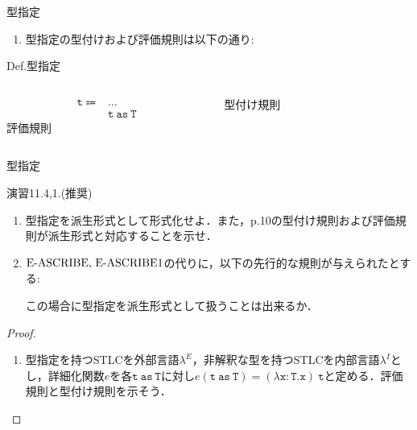 \documentclass[9pt]{beamer}
\begin{document}
\begin{frame}{型指定}
\begin{enumerate}
\item 型指定の型付けおよび評価規則は以下の通り:
\end{enumerate}
\begin{alertblock}{Def.型指定}
    \begin{columns}
    \begin{column}{0.30\columnwidth}
        \begin{align*}
        \mathtt{t}\Coloneq&\ldots\\
        &\mathtt{t\ as\ T}
        \end{align*}
        評価規則
        \begin{prooftree}
        \end{prooftree}
        \begin{prooftree}
        \end{prooftree}
    \end{column}
    \begin{column}{0.40\columnwidth}
        型付け規則
        \begin{prooftree}
        \end{prooftree}
    \end{column}
    \end{columns}
\end{alertblock}
\end{frame}
\begin{frame}{型指定}
\begin{alertblock}{演習11.4,1.(推奨)}
    \begin{enumerate}
    \item 型指定を派生形式として形式化せよ．また，p.10の型付け規則および評価規則が派生形式と対応することを示せ．
    \item $\text{\rm{E-ASCRIBE, E-ASCRIBE1}}$の代りに，以下の先行的な規則が与えられたとする:\begin{prooftree}
    \end{prooftree}
    この場合に型指定を派生形式として扱うことは出来るか．
    \end{enumerate}
\end{alertblock}
\begin{proof}
    \begin{enumerate}
    \item 型指定を持つSTLCを外部言語$\lambda^{E}$，非解釈な型を持つSTLCを内部言語$\lambda^{I}$とし，詳細化関数$e$を各$\mathtt{t\ as\ T}$に対し$e(\mathtt{t\ as\ T}) = \mathtt{(\lambda x : T. x)\ t}$と定める．評価規則と型付け規則を示そう．
    \end{enumerate}
\end{proof}
\end{frame}
\end{document}
